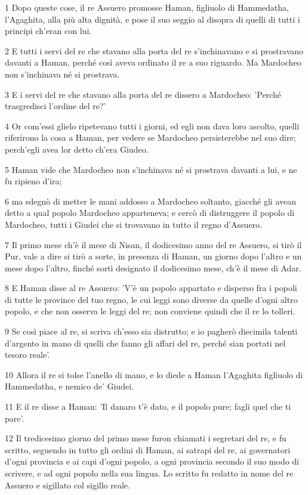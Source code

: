 \par 1 Dopo queste cose, il re Assuero promosse Haman, figliuolo di Hammedatha, l'Agaghita, alla più alta dignità, e pose il suo seggio al disopra di quelli di tutti i principi ch'eran con lui.
\par 2 E tutti i servi del re che stavano alla porta del re s'inchinavano e si prostravano davanti a Haman, perché così aveva ordinato il re a suo riguardo. Ma Mardocheo non s'inchinava né si prostrava.
\par 3 E i servi del re che stavano alla porta del re dissero a Mardocheo: 'Perché trasgredisci l'ordine del re?'
\par 4 Or com'essi glielo ripetevano tutti i giorni, ed egli non dava loro ascolto, quelli riferirono la cosa a Haman, per vedere se Mardocheo persisterebbe nel suo dire; perch'egli avea lor detto ch'era Giudeo.
\par 5 Haman vide che Mardocheo non s'inchinava né si prostrava davanti a lui, e ne fu ripieno d'ira;
\par 6 ma sdegnò di metter le mani addosso a Mardocheo soltanto, giacché gli avean detto a qual popolo Mardocheo apparteneva; e cercò di distruggere il popolo di Mardocheo, tutti i Giudei che si trovavano in tutto il regno d'Assuero.
\par 7 Il primo mese ch'è il mese di Nisan, il dodicesimo anno del re Assuero, si tirò il Pur, vale a dire si tirò a sorte, in presenza di Haman, un giorno dopo l'altro e un mese dopo l'altro, finché sortì designato il dodicesimo mese, ch'è il mese di Adar.
\par 8 E Haman disse al re Assuero: 'V'è un popolo appartato e disperso fra i popoli di tutte le province del tuo regno, le cui leggi sono diverse da quelle d'ogni altro popolo, e che non osserva le leggi del re; non conviene quindi che il re lo tolleri.
\par 9 Se così piace al re, si scriva ch'esso sia distrutto; e io pagherò diecimila talenti d'argento in mano di quelli che fanno gli affari del re, perché sian portati nel tesoro reale'.
\par 10 Allora il re si tolse l'anello di mano, e lo diede a Haman l'Agaghita figliuolo di Hammedatha, e nemico de' Giudei.
\par 11 E il re disse a Haman: 'Il danaro t'è dato, e il popolo pure; fagli quel che ti pare'.
\par 12 Il tredicesimo giorno del primo mese furon chiamati i segretari del re, e fu scritto, seguendo in tutto gli ordini di Haman, ai satrapi del re, ai governatori d'ogni provincia e ai capi d'ogni popolo, a ogni provincia secondo il suo modo di scrivere, e ad ogni popolo nella sua lingua. Lo scritto fu redatto in nome del re Assuero e sigillato col sigillo reale.

